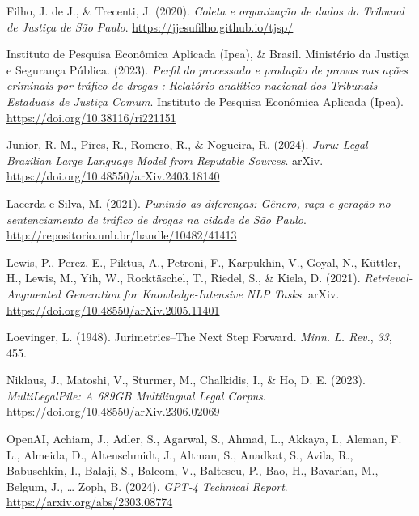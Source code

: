 \documentclass[
  12pt,
]{article}
\newlength{\cslhangindent}
\newenvironment{CSLReferences}[2] %
 {\begin{list}{}{%
  \setlength{\itemindent}{0pt}
  \setlength{\leftmargin}{0pt}
  \setlength{\parsep}{0pt}
  \ifodd #1
   \setlength{\leftmargin}{\cslhangindent}
   \setlength{\itemindent}{-1\cslhangindent}
  \fi
  \setlength{\itemsep}{#2\baselineskip}}}
 {\end{list}}
\begin{document}
\begin{CSLReferences}{1}{0}
Filho, J. de J., \& Trecenti, J. (2020). \emph{Coleta e organização de
dados do {Tribunal} de {Justiça} de {São} {Paulo}}.
\url{https://jjesufilho.github.io/tjsp/}

Instituto de Pesquisa Econômica Aplicada (Ipea), \& Brasil. Ministério
da Justiça e Segurança Pública. (2023). \emph{Perfil do processado e
produção de provas nas ações criminais por tráfico de drogas : Relatório
analítico nacional dos {Tribunais} {Estaduais} de {Justiça} {Comum}}.
Instituto de Pesquisa Econômica Aplicada (Ipea).
\url{https://doi.org/10.38116/ri221151}

Junior, R. M., Pires, R., Romero, R., \& Nogueira, R. (2024).
\emph{Juru: {Legal} {Brazilian} {Large} {Language} {Model} from
{Reputable} {Sources}}. arXiv.
\url{https://doi.org/10.48550/arXiv.2403.18140}

Lacerda e Silva, M. (2021). \emph{Punindo as diferenças: {Gênero}, raça
e geração no sentenciamento de tráfico de drogas na cidade de {São}
{Paulo}}. \url{http://repositorio.unb.br/handle/10482/41413}

Lewis, P., Perez, E., Piktus, A., Petroni, F., Karpukhin, V., Goyal, N.,
Küttler, H., Lewis, M., Yih, W., Rocktäschel, T., Riedel, S., \& Kiela,
D. (2021). \emph{Retrieval-{Augmented} {Generation} for
{Knowledge}-{Intensive} {NLP} {Tasks}}. arXiv.
\url{https://doi.org/10.48550/arXiv.2005.11401}

Loevinger, L. (1948). Jurimetrics--{The} {Next} {Step} {Forward}.
\emph{Minn. L. Rev.}, \emph{33}, 455.

Niklaus, J., Matoshi, V., Sturmer, M., Chalkidis, I., \& Ho, D. E.
(2023). \emph{{MultiLegalPile}: {A} {689GB} {Multilingual} {Legal}
{Corpus}}. \url{https://doi.org/10.48550/arXiv.2306.02069}

OpenAI, Achiam, J., Adler, S., Agarwal, S., Ahmad, L., Akkaya, I.,
Aleman, F. L., Almeida, D., Altenschmidt, J., Altman, S., Anadkat, S.,
Avila, R., Babuschkin, I., Balaji, S., Balcom, V., Baltescu, P., Bao,
H., Bavarian, M., Belgum, J., \ldots{} Zoph, B. (2024). \emph{{GPT}-4
{Technical} {Report}}. \url{https://arxiv.org/abs/2303.08774}


\end{CSLReferences}
\end{document}
